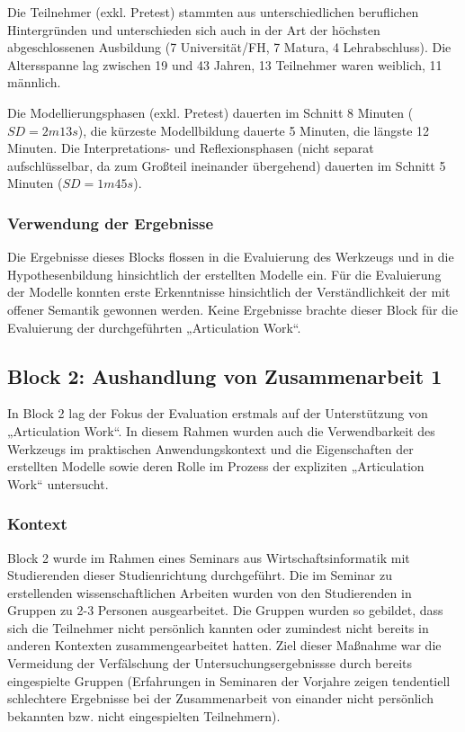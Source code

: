 Die Teilnehmer (exkl. Pretest) stammten aus unterschiedlichen beruflichen Hintergründen und unterschieden sich auch in der Art der höchsten abgeschlossenen Ausbildung (7 Universität/FH, 7 Matura, 4 Lehrabschluss). Die Altersspanne lag zwischen 19 und 43 Jahren, 13 Teilnehmer waren weiblich, 11 männlich.

Die Modellierungsphasen (exkl. Pretest) dauerten im Schnitt 8 Minuten ($SD=2m13s$), die kürzeste Modellbildung dauerte 5 Minuten, die längste 12 Minuten. Die Interpretations- und Reflexionsphasen (nicht separat aufschlüsselbar, da zum Großteil ineinander übergehend) dauerten im Schnitt 5 Minuten ($SD=1m45s$). 


\subsubsection{Verwendung der Ergebnisse} %
\label{ssub:1_verwendung_der_ergebnisse}

Die Ergebnisse dieses Blocks flossen in die Evaluierung des Werkzeugs und in die Hypothesenbildung hinsichtlich der erstellten Modelle ein. Für die Evaluierung der Modelle konnten erste Erkenntnisse hinsichtlich der Verständlichkeit der mit offener Semantik gewonnen werden. Keine Ergebnisse brachte dieser Block für die Evaluierung der durchgeführten „Articulation Work“.


\subsection{Block 2: Aushandlung von Zusammenarbeit 1}
\label{sub:eval_2}

In Block 2 lag der Fokus der Evaluation erstmals auf der Unterstützung von „Articulation Work“. In diesem Rahmen wurden auch die Verwendbarkeit des Werkzeugs im praktischen Anwendungskontext und die Eigenschaften der erstellten Modelle sowie deren Rolle im Prozess der expliziten „Articulation Work“ untersucht.

\subsubsection{Kontext} %
\label{ssub:2_kontext}

Block 2 wurde im Rahmen eines Seminars aus Wirtschaftsinformatik mit Studierenden dieser Studienrichtung durchgeführt. Die im Seminar zu erstellenden wissenschaftlichen Arbeiten wurden von den Studierenden in Gruppen zu 2-3 Personen ausgearbeitet. Die Gruppen wurden so gebildet, dass sich die Teilnehmer nicht persönlich kannten oder zumindest nicht bereits in anderen Kontexten zusammengearbeitet hatten. Ziel dieser Maßnahme war die Vermeidung der Verfälschung der Untersuchungsergebnissse durch bereits eingespielte Gruppen (Erfahrungen in Seminaren der Vorjahre zeigen tendentiell schlechtere Ergebnisse bei der Zusammenarbeit von einander nicht persönlich bekannten bzw. nicht eingespielten Teilnehmern).

